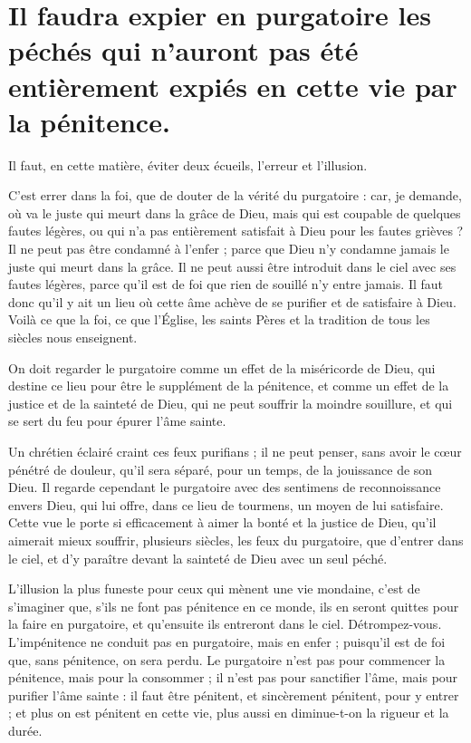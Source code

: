 \documentclass[instructions.tex]{subfiles}
\begin{document}
 
\chapter{Il faudra expier en purgatoire les péchés qui n’auront pas été entièrement expiés en cette vie par la pénitence.}
 
Il faut, en cette matière, éviter deux écueils, l’erreur et l’illusion.
 
\primo C’est errer dans la foi, que de douter de la vérité du purgatoire : car, je demande, où va le juste qui meurt dans la grâce de Dieu, mais qui est coupable de quelques fautes légères, ou qui n’a pas entièrement satisfait à Dieu pour les fautes grièves ? Il ne peut pas être condamné à l’enfer ; parce que Dieu n’y condamne jamais le juste qui meurt dans la grâce. Il ne peut aussi être introduit dans le ciel avec ses fautes légères, parce qu’il est de foi que rien de souillé n’y entre jamais. Il faut donc qu’il y ait un lieu où cette âme achève de se purifier et de satisfaire à Dieu. Voilà ce que la foi, ce que l’Église, les saints Pères et la tradition de tous les siècles nous enseignent.
 
On doit regarder le purgatoire comme un effet de la miséricorde de Dieu, qui destine ce lieu pour être le supplément de la pénitence, et comme un effet de la justice et de la sainteté de Dieu, qui ne peut souffrir la moindre souillure, et qui se sert du feu pour épurer l’âme sainte.
 
Un chrétien éclairé craint ces feux purifians ; il ne peut penser, sans avoir le cœur pénétré de douleur, qu’il sera séparé, pour un temps, de la jouissance de son Dieu. Il regarde cependant le purgatoire avec des sentimens de reconnoissance envers Dieu, qui lui offre, dans ce lieu de tourmens, un moyen de lui satisfaire. Cette vue le porte si efficacement à aimer la bonté et la justice de Dieu, qu’il aimerait mieux souffrir, plusieurs siècles, les feux du purgatoire, que d’entrer dans le ciel, et d’y paraître devant la sainteté de Dieu avec un seul péché.
 
\secundo L’illusion la plus funeste pour ceux qui mènent une vie mondaine, c’est de s’imaginer que, s’ils ne font pas pénitence en ce monde, ils en seront quittes pour la faire en purgatoire, et qu’ensuite ils entreront dans le ciel. Détrompez-vous. L’impénitence ne conduit pas en purgatoire, mais en enfer ; puisqu’il est de foi que, sans pénitence, on sera perdu. Le purgatoire n’est pas pour commencer la pénitence, mais pour la consommer ; il n’est pas pour sanctifier l’âme, mais pour purifier l’âme sainte : il faut être pénitent, et sincèrement pénitent, pour y entrer ; et plus on est pénitent en cette vie, plus aussi en diminue-t-on la rigueur et la durée.
 
\end{document}
